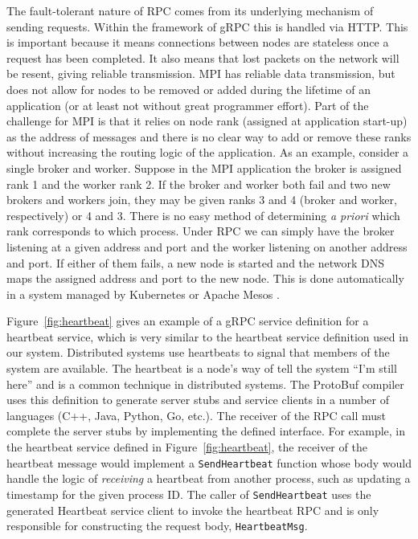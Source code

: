 \documentclass[conference]{IEEEtran}
\begin{document}
The fault-tolerant nature of RPC comes from its underlying mechanism of sending
requests. Within the framework of gRPC this is handled via HTTP. This
is important because it means connections between nodes are stateless once
a request has been completed. It also means that lost packets on the network
will be resent, giving reliable transmission. MPI has reliable data transmission,
but does not allow for nodes to be removed or added during the lifetime of an
application (or at least not without great programmer effort). Part of the
challenge for MPI is that it relies on node rank (assigned at application
start-up) as the address of messages and there is no clear way to add or remove
these ranks without increasing the routing logic of the application. As an
example, consider a single broker and worker. Suppose in the MPI application
the broker is assigned rank 1 and the worker rank 2. If the broker and worker
both fail and two new brokers and workers join, they may be given ranks 3 and
4 (broker and worker, respectively) or 4 and 3. There is no easy method of
determining \emph{a priori} which rank corresponds to which process. Under
RPC we can simply have the broker listening at a given address and port and
the worker listening on another address and port. If either of them fails,
a new node is started and the network DNS maps the assigned address and port
to the new node. This is done automatically in a system managed by Kubernetes \cite{43826}
or Apache Mesos \cite{Hindman:2011:MPF:1972457.1972488}.

Figure~\ref{fig:heartbeat} gives an example of a gRPC service
definition for a heartbeat service, which is very similar to the heartbeat
service definition used in our system. Distributed systems use heartbeats
to signal that members of the system are available. The heartbeat is a node's
way of tell the system ``I'm still here'' and is a common
technique in distributed systems.
The ProtoBuf compiler uses this definition
to generate server stubs and service clients in a number of languages (C++,
Java, Python, Go, etc.). The receiver of the RPC call must complete the server
stubs by implementing the defined interface. For example, in the heartbeat
service defined in Figure~\ref{fig:heartbeat}, the receiver of the heartbeat
message would implement a \texttt{SendHeartbeat} function whose body would
handle the logic of \emph{receiving} a heartbeat from another process,
such as updating a timestamp for the given process ID. The caller of
\texttt{SendHeartbeat} uses the generated Heartbeat service client to invoke
the heartbeat RPC and is only
responsible for constructing the request body, \texttt{HeartbeatMsg}.
\end{document}
